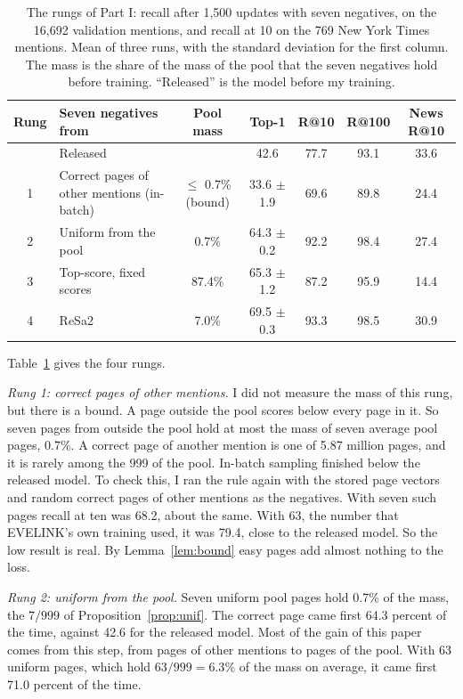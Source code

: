 \documentclass[11pt]{article}
\theoremstyle{definition}
\begin{document}
\begin{table}[t]
\centering
\footnotesize
\setlength{\tabcolsep}{4pt}
\caption{The rungs of Part I: recall after 1,500 updates with seven negatives, on the 16,692 validation mentions, and recall at 10 on the 769 New York Times mentions. Mean of three runs, with the standard deviation for the first column. The mass is the share of the mass of the pool that the seven negatives hold before training. ``Released'' is the model before my training.}
\label{tab:part1}
\begin{tabular}{@{}clccccc@{}}
\toprule
Rung & Seven negatives from & Pool mass & Top-1 & R@10 & R@100 & News R@10 \\
\midrule
 & Released & & 42.6 & 77.7 & 93.1 & 33.6 \\
1 & Correct pages of other mentions (in-batch) & $\le$ 0.7\% (bound) & 33.6 $\pm$ 1.9 & 69.6 & 89.8 & 24.4 \\
2 & Uniform from the pool & 0.7\% & 64.3 $\pm$ 0.2 & 92.2 & 98.4 & 27.4 \\
3 & Top-score, fixed scores & 87.4\% & 65.3 $\pm$ 1.2 & 87.2 & 95.9 & 14.4 \\
4 & ReSa2 & 7.0\% & 69.5 $\pm$ 0.3 & 93.3 & 98.5 & 30.9 \\
\bottomrule
\end{tabular}
\end{table}

Table~\ref{tab:part1} gives the four rungs.

\emph{Rung 1: correct pages of other mentions.} I did not measure the mass of this rung, but there is a bound. A page outside the pool scores below every page in it. So seven pages from outside the pool hold at most the mass of seven average pool pages, 0.7\%. A correct page of another mention is one of 5.87 million pages, and it is rarely among the 999 of the pool. In-batch sampling finished below the released model. To check this, I ran the rule again with the stored page vectors and random correct pages of other mentions as the negatives. With seven such pages recall at ten was 68.2, about the same. With 63, the number that EVELINK's own training used, it was 79.4, close to the released model. So the low result is real. By Lemma~\ref{lem:bound} easy pages add almost nothing to the loss.

\emph{Rung 2: uniform from the pool.} Seven uniform pool pages hold 0.7\% of the mass, the $7/999$ of Proposition~\ref{prop:unif}. The correct page came first 64.3 percent of the time, against 42.6 for the released model. Most of the gain of this paper comes from this step, from pages of other mentions to pages of the pool. With 63 uniform pages, which hold $63/999 = 6.3\%$ of the mass on average, it came first 71.0 percent of the time.
\end{document}
